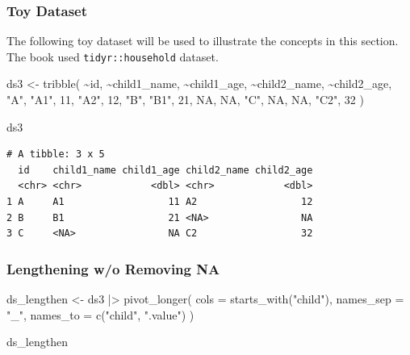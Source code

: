 \documentclass[
  letterpaper,
  DIV=11,
  numbers=noendperiod]{scrreprt}
\newenvironment{Shaded}{\begin{snugshade}}{\end{snugshade}}
\newcommand{\AttributeTok}[1]{\textcolor[rgb]{0.40,0.45,0.13}{#1}}
\newcommand{\ConstantTok}[1]{\textcolor[rgb]{0.56,0.35,0.01}{#1}}
\newcommand{\DecValTok}[1]{\textcolor[rgb]{0.68,0.00,0.00}{#1}}
\newcommand{\FunctionTok}[1]{\textcolor[rgb]{0.28,0.35,0.67}{#1}}
\newcommand{\NormalTok}[1]{\textcolor[rgb]{0.00,0.23,0.31}{#1}}
\newcommand{\OtherTok}[1]{\textcolor[rgb]{0.00,0.23,0.31}{#1}}
\newcommand{\SpecialCharTok}[1]{\textcolor[rgb]{0.37,0.37,0.37}{#1}}
\newcommand{\StringTok}[1]{\textcolor[rgb]{0.13,0.47,0.30}{#1}}
\begin{document}
\subsubsection{Toy Dataset}\label{toy-dataset-2}

The following toy dataset will be used to illustrate the concepts in
this section. The book used \texttt{tidyr::household} dataset.

\begin{Shaded}
\begin{Highlighting}[]
\NormalTok{ds3 }\OtherTok{\textless{}{-}} \FunctionTok{tribble}\NormalTok{(}
  \SpecialCharTok{\textasciitilde{}}\NormalTok{id, }\SpecialCharTok{\textasciitilde{}}\NormalTok{child1\_name, }\SpecialCharTok{\textasciitilde{}}\NormalTok{child1\_age, }\SpecialCharTok{\textasciitilde{}}\NormalTok{child2\_name, }\SpecialCharTok{\textasciitilde{}}\NormalTok{child2\_age,}
  \StringTok{"A"}\NormalTok{, }\StringTok{"A1"}\NormalTok{, }\DecValTok{11}\NormalTok{, }\StringTok{"A2"}\NormalTok{, }\DecValTok{12}\NormalTok{,}
  \StringTok{"B"}\NormalTok{, }\StringTok{"B1"}\NormalTok{, }\DecValTok{21}\NormalTok{, }\ConstantTok{NA}\NormalTok{, }\ConstantTok{NA}\NormalTok{,}
  \StringTok{"C"}\NormalTok{, }\ConstantTok{NA}\NormalTok{, }\ConstantTok{NA}\NormalTok{, }\StringTok{"C2"}\NormalTok{, }\DecValTok{32}
\NormalTok{)}

\NormalTok{ds3}
\end{Highlighting}
\end{Shaded}

\begin{verbatim}
# A tibble: 3 x 5
  id    child1_name child1_age child2_name child2_age
  <chr> <chr>            <dbl> <chr>            <dbl>
1 A     A1                  11 A2                  12
2 B     B1                  21 <NA>                NA
3 C     <NA>                NA C2                  32
\end{verbatim}

\subsubsection{Lengthening w/o Removing
NA}\label{lengthening-wo-removing-na}

\begin{Shaded}
\begin{Highlighting}[]
\NormalTok{ds\_lengthen }\OtherTok{\textless{}{-}}\NormalTok{ ds3 }\SpecialCharTok{|\textgreater{}} 
  \FunctionTok{pivot\_longer}\NormalTok{(}
    \AttributeTok{cols =} \FunctionTok{starts\_with}\NormalTok{(}\StringTok{"child"}\NormalTok{),}
    \AttributeTok{names\_sep =} \StringTok{"\_"}\NormalTok{,}
    \AttributeTok{names\_to =} \FunctionTok{c}\NormalTok{(}\StringTok{"child"}\NormalTok{, }\StringTok{".value"}\NormalTok{)}
\NormalTok{  )}

\NormalTok{ds\_lengthen}
\end{Highlighting}
\end{Shaded}
\end{document}
